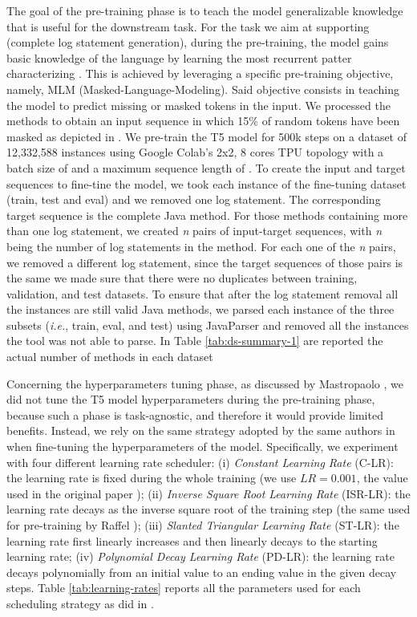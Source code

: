 The goal of the pre-training phase is to teach the model generalizable knowledge that is useful for the downstream task. For the task we aim at supporting (\ie complete log statement generation), during the pre-training, the model gains basic knowledge of the \java language by learning the most recurrent patter characterizing \java. This is achieved by leveraging a specific pre-training objective, namely, MLM (Masked-Language-Modeling). Said objective consists in teaching the model to predict missing or masked tokens in the input. We processed the methods to obtain an input sequence in which 15\% of random tokens have been masked as depicted in .
We pre-train the T5 model for 500k steps on a dataset of 12,332,588 instances using Google Colab's 2x2, 8 cores TPU topology with a batch size of  and a maximum sequence length of . 
To create the input and target sequences to fine-tine the model, we took each instance of the fine-tuning dataset (\ie train, test and eval) and we removed one log statement. The corresponding target sequence is the complete Java method.
For those methods containing more than one log statement, we created \emph{n} pairs of input-target sequences, with \emph{n} being the number of log statements in the method.
For each one of the \emph{n} pairs, we removed a different log statement, since the target sequences of those pairs is the same we made sure that there were no duplicates between training, validation, and test datasets. 
To ensure that after the log statement removal all the instances are still valid Java methods, we parsed each instance of the three subsets (\emph{i.e.}, train, eval, and test) using JavaParser \cite{javaparser} and removed all the instances the tool was not able to parse.
In Table \ref{tab:ds-summary-1} are reported the actual number of methods in each dataset



Concerning the hyperparameters tuning phase, as discussed by Mastropaolo \etal \cite{mastropaolo2021studying}, we did not tune the T5 model hyperparameters during the pre-training phase, because such a phase is task-agnostic, and therefore it would provide limited benefits. Instead, we rely on the same strategy adopted by the same authors in \cite{mastropaolo2022using} when fine-tuning the hyperparameters of the model. Specifically, we experiment with four different learning rate scheduler: (i) \textit{Constant Learning Rate} (C-LR): the learning rate is fixed during the whole training (we use $LR = 0.001$, \ie the value used in the original paper \cite{raffel2019exploring}); (ii) \textit{Inverse Square Root Learning Rate} (ISR-LR): the learning rate decays as the inverse square root of the training step (the same used for pre-training by Raffel \etal); (iii) \textit{Slanted Triangular Learning Rate \cite{howard2018universal}} (ST-LR): the learning rate first linearly increases and then linearly decays to the starting learning rate;  (iv) \textit{Polynomial Decay Learning Rate} (PD-LR): the learning rate decays polynomially from an initial value to an ending value in the given decay steps. Table \ref{tab:learning-rates} reports all the parameters used for each scheduling strategy as did in \cite{mastropaolo2022using}.

